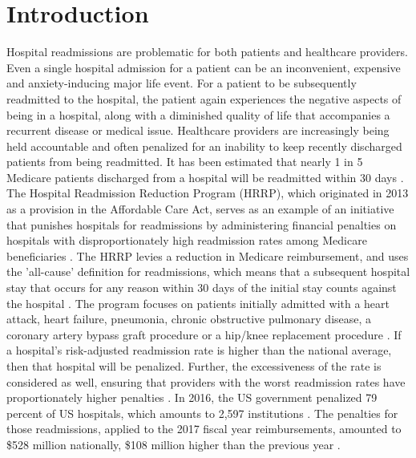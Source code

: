 \documentclass[sigconf]{acmart}
\begin{document}

\maketitle

\section{Introduction}

Hospital readmissions are problematic for both patients and healthcare providers. Even a single hospital admission for a patient can be an inconvenient, expensive and anxiety-inducing major life event. For a patient to be subsequently readmitted to the hospital, the patient again experiences the negative aspects of being in a hospital, along with a diminished quality of life that accompanies a recurrent disease or medical issue. Healthcare providers are increasingly being held accountable and often penalized for an inability to keep recently discharged patients from being readmitted. It has been estimated that nearly 1 in 5 Medicare patients discharged from a hospital will be readmitted within 30 days \cite{cite05}.
The Hospital Readmission Reduction Program (HRRP), which originated in 2013 as a provision in the Affordable Care Act, serves as an example of an initiative that punishes hospitals for readmissions by administering financial penalties on hospitals with disproportionately high readmission rates among Medicare beneficiaries \cite{cite06}. The HRRP levies a reduction in Medicare reimbursement, and uses the 'all-cause' definition for readmissions, which means that a subsequent hospital stay that occurs for any reason within 30 days of the initial stay counts against the hospital \cite{cite06}. The program focuses on patients initially admitted with a heart attack, heart failure, pneumonia, chronic obstructive pulmonary disease, a coronary artery bypass graft procedure or a hip/knee replacement procedure \cite{cite06}. If a hospital's risk-adjusted readmission rate is higher than the national average, then that hospital will be penalized. Further, the excessiveness of the rate is considered as well, ensuring that providers with the worst readmission rates have proportionately higher penalties \cite{cite06}. In 2016, the US government penalized 79 percent of US hospitals, which amounts to 2,597 institutions \cite{cite00}. The penalties for those readmissions, applied to the 2017 fiscal year reimbursements, amounted to \$528 million nationally, \$108 million higher than the previous year \cite{cite00}. 
\end{document}
